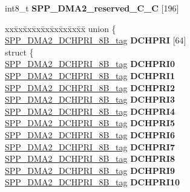 \begin{DoxyCompactItemize}
\item 
\mbox{\label{structSPP__DMA2__struct__tag_a4c6e4662d82dd4afe7d95328afc995b7}} 
int8\+\_\+t {\bfseries S\+P\+P\+\_\+\+D\+M\+A2\+\_\+reserved\+\_\+C\+\_\+C} \mbox{[}196\mbox{]}
\item 
\mbox{\label{structSPP__DMA2__struct__tag_acd86c26ca3e30267a866b5772d63d838}} 
\begin{tabbing}
xx\=xx\=xx\=xx\=xx\=xx\=xx\=xx\=xx\=\kill
union \{\\
\>\mbox{\hyperlink{unionSPP__DMA2__DCHPRI__8B__tag}{SPP\_DMA2\_DCHPRI\_8B\_tag}} {\bfseries DCHPRI} \mbox{[}64\mbox{]}\\
\mbox{\label{unionSPP__DMA2__struct__tag_1_1_0D2263_aca73b54382ca21ac66e2d5091fc10e48}} 
\>struct \{\\
\>\>\mbox{\hyperlink{unionSPP__DMA2__DCHPRI__8B__tag}{SPP\_DMA2\_DCHPRI\_8B\_tag}} {\bfseries DCHPRI0}\\
\>\>\mbox{\hyperlink{unionSPP__DMA2__DCHPRI__8B__tag}{SPP\_DMA2\_DCHPRI\_8B\_tag}} {\bfseries DCHPRI1}\\
\>\>\mbox{\hyperlink{unionSPP__DMA2__DCHPRI__8B__tag}{SPP\_DMA2\_DCHPRI\_8B\_tag}} {\bfseries DCHPRI2}\\
\>\>\mbox{\hyperlink{unionSPP__DMA2__DCHPRI__8B__tag}{SPP\_DMA2\_DCHPRI\_8B\_tag}} {\bfseries DCHPRI3}\\
\>\>\mbox{\hyperlink{unionSPP__DMA2__DCHPRI__8B__tag}{SPP\_DMA2\_DCHPRI\_8B\_tag}} {\bfseries DCHPRI4}\\
\>\>\mbox{\hyperlink{unionSPP__DMA2__DCHPRI__8B__tag}{SPP\_DMA2\_DCHPRI\_8B\_tag}} {\bfseries DCHPRI5}\\
\>\>\mbox{\hyperlink{unionSPP__DMA2__DCHPRI__8B__tag}{SPP\_DMA2\_DCHPRI\_8B\_tag}} {\bfseries DCHPRI6}\\
\>\>\mbox{\hyperlink{unionSPP__DMA2__DCHPRI__8B__tag}{SPP\_DMA2\_DCHPRI\_8B\_tag}} {\bfseries DCHPRI7}\\
\>\>\mbox{\hyperlink{unionSPP__DMA2__DCHPRI__8B__tag}{SPP\_DMA2\_DCHPRI\_8B\_tag}} {\bfseries DCHPRI8}\\
\>\>\mbox{\hyperlink{unionSPP__DMA2__DCHPRI__8B__tag}{SPP\_DMA2\_DCHPRI\_8B\_tag}} {\bfseries DCHPRI9}\\
\>\>\mbox{\hyperlink{unionSPP__DMA2__DCHPRI__8B__tag}{SPP\_DMA2\_DCHPRI\_8B\_tag}} {\bfseries DCHPRI10}\\

\end{tabbing}
\end{DoxyCompactItemize}
